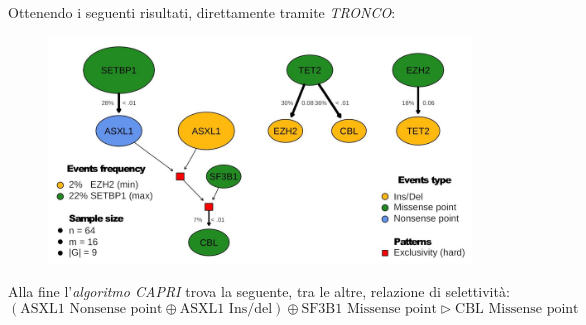 \documentclass[a4paper,12pt, oneside]{book}
\begin{document}
Ottenendo i seguenti risultati, direttamente tramite \textit{TRONCO}:
\begin{figure}[H]
  \centering
  \includegraphics[scale = 0.22]{img/acml2.jpg}
\end{figure}
Alla fine l'\textit{algoritmo CAPRI} trova la seguente, tra le altre, relazione
di selettività:
{\footnotesize{\[(\mbox{ASXL1 Nonsense point} \oplus \mbox{ASXL1 Ins/del})
      \oplus \mbox{SF3B1 Missense point} \triangleright \mbox{CBL Missense
        point}\]}}
\end{document}
